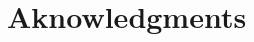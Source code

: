 \documentclass{bredele}
\begin{document}
%
%
%
%

%
%
%


\clearemptydoublepage
\chapter*{Aknowledgments}
\thispagestyle{empty}

\clearemptydoublepage
\frontmatter


\clearemptydoublepage
\tableofcontents
\clearemptydoublepage
\listoffigures
\end{document}
